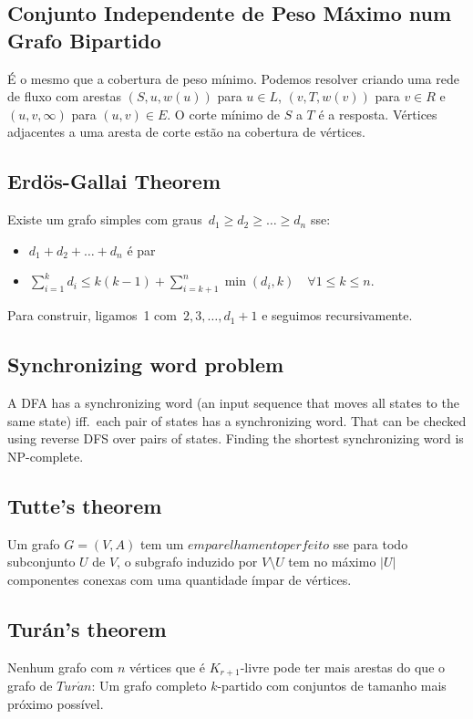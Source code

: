 \subsection{Conjunto Independente de Peso Máximo num Grafo Bipartido}
É o mesmo que a cobertura de peso mínimo. Podemos resolver criando uma rede de fluxo com arestas $(S,u,w(u))$ para $u\in L$,
$(v,T,w(v))$ para $v\in R$ e $(u,v,\infty)$ para $(u,v)\in E$. O corte mínimo de $S$ a $T$ é a resposta. Vértices adjacentes a uma aresta de corte estão na cobertura de vértices.

\subsection{Erdös-Gallai Theorem}
Existe um grafo simples com graus~$d_1 \geq d_2 \geq \ldots \geq d_n$ sse:
\begin{itemize}
\item $d_1 + d_2 + \ldots + d_n$ é par
\item $\sum\limits_{i = 1}^k{d_i} \leq k(k-1) + \sum\limits_{i=k+1}^n{\min(d_i, k)} \quad \forall 1 \leq k \leq n$.
\end{itemize}
Para construir, ligamos~1 com~$2, 3, \ldots, d_1 + 1$ e seguimos recursivamente.

\subsection{Synchronizing word problem}
A DFA has a synchronizing word (an input sequence that moves all states
to the same state) iff.\ each pair of states has a synchronizing word.
That can be checked using reverse DFS over pairs of states. Finding the
shortest synchronizing word is NP-complete.

\subsection{Tutte's theorem}
Um grafo $G = (V, A)$ tem um $emparelhamento perfeito$ sse para todo subconjunto $U$ de $V$, o subgrafo induzido por $V \setminus U$ tem no máximo $|U|$ componentes conexas com uma quantidade ímpar de vértices.

\subsection{Turán's theorem} 
Nenhum grafo com $n$ vértices que é $K_{r+1}$-livre pode ter mais arestas do que o grafo de $Tur\acute{a}n$: Um grafo completo $k$-partido com conjuntos de tamanho mais próximo possível.



